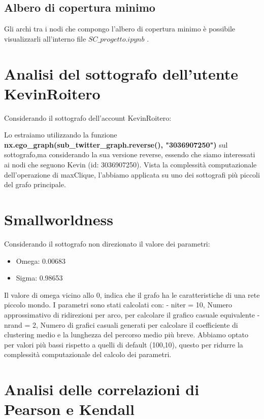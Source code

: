 \documentclass[a4paper,11pt]{report}
\begin{document}
\subsection{Albero di copertura minimo}
Gli archi tra i nodi che compongo l'albero di copertura minimo è possibile visualizzarli all'interno file $SC\_progetto.ipynb$ .

\section{Analisi del sottografo dell'utente KevinRoitero}
Considerando il sottografo dell'account KevinRoitero:

Lo estraiamo utilizzando la funzione \textbf{nx.ego\_graph(sub\_twitter\_graph.reverse(), "3036907250")} sul sottografo,ma considerando la sua versione reverse, essendo che siamo interessati ai nodi che seguono Kevin (id: 3036907250).
Vista la complessità computazionale dell'operazione di maxClique, l'abbiamo applicata su uno dei sottografi più piccoli del grafo principale. 

\section{Smallworldness}
Considerando il sottografo non direzionato il valore dei parametri:
	\begin{itemize}
	\item Omega: 0.00683
	\item Sigma: 0.98653
\end{itemize}
Il valore di omega vicino allo 0, indica che il grafo ha le caratteristiche di una rete piccolo mondo.
I parametri sono stati calcolati con:\newline
- niter = 10, Numero approssimativo di ridirezioni per arco, per calcolare il grafico casuale equivalente\newline
- nrand = 2, Numero di grafici casuali generati per calcolare il coefficiente di clustering medio e la lunghezza del percorso medio più breve.\newline
Abbiamo optato per valori più bassi rispetto a quelli di default (100,10), questo per ridurre la complessità computazionale del calcolo dei parametri.
\pagebreak
\section{Analisi delle correlazioni di Pearson e Kendall}
\end{document}
